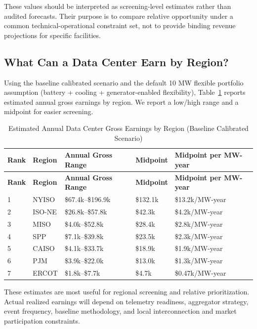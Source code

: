 \documentclass[12pt]{article}
\begin{document}
These values should be interpreted as screening-level estimates rather than audited forecasts. Their purpose is to compare relative opportunity under a common technical-operational constraint set, not to provide binding revenue projections for specific facilities.

\subsection{What Can a Data Center Earn by Region?}

Using the baseline calibrated scenario and the default 10 MW flexible portfolio assumption (battery + cooling + generator-enabled flexibility), Table~\ref{tab:earnings_region} reports estimated annual gross earnings by region. We report a low/high range and a midpoint for easier screening.

\begin{longtable}{p{1.6cm}p{2.2cm}p{3.4cm}p{3.2cm}p{3cm}}
\caption{Estimated Annual Data Center Gross Earnings by Region (Baseline Calibrated Scenario)}\label{tab:earnings_region}\\
\toprule
\textbf{Rank} & \textbf{Region} & \textbf{Annual Gross Range} & \textbf{Midpoint} & \textbf{Midpoint per MW-year} \\
\midrule
\endfirsthead
\toprule
\textbf{Rank} & \textbf{Region} & \textbf{Annual Gross Range} & \textbf{Midpoint} & \textbf{Midpoint per MW-year} \\
\midrule
\endhead
1 & NYISO & \$67.4k--\$196.9k & \$132.1k & \$13.2k/MW-year \\
\midrule
2 & ISO-NE & \$26.8k--\$57.8k & \$42.3k & \$4.2k/MW-year \\
\midrule
3 & MISO & \$4.0k--\$52.8k & \$28.4k & \$2.8k/MW-year \\
\midrule
4 & SPP & \$7.1k--\$39.8k & \$23.5k & \$2.3k/MW-year \\
\midrule
5 & CAISO & \$4.1k--\$33.7k & \$18.9k & \$1.9k/MW-year \\
\midrule
6 & PJM & \$3.9k--\$22.0k & \$13.0k & \$1.3k/MW-year \\
\midrule
7 & ERCOT & \$1.8k--\$7.7k & \$4.7k & \$0.47k/MW-year \\
\bottomrule
\end{longtable}

These estimates are most useful for regional screening and relative prioritization. Actual realized earnings will depend on telemetry readiness, aggregator strategy, event frequency, baseline methodology, and local interconnection and market participation constraints.
\end{document}
